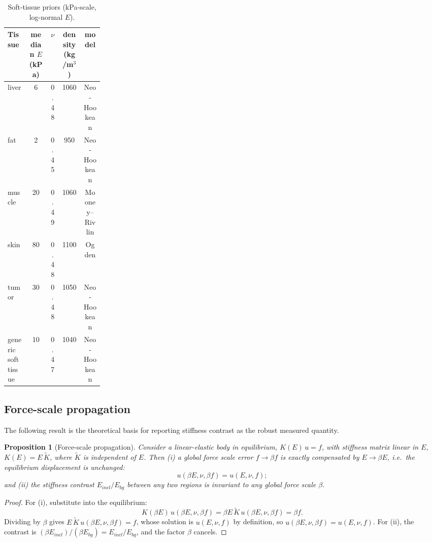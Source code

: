 \documentclass[review]{elsarticle}
\newtheorem{proposition}{Proposition}
\begin{document}
\begin{table}[htbp]
\centering
\caption{Soft-tissue priors (kPa-scale, log-normal $E$).}
\label{tab:tissue}
\footnotesize
\begin{tabular}{@{}p{0.22\linewidth}cccc@{}}
\toprule
Tissue & median $E$ (kPa) & $\nu$ & density (kg/m$^3$) & model \\
\midrule
liver & 6 & 0.48 & 1060 & Neo-Hookean \\
fat & 2 & 0.45 & 950 & Neo-Hookean \\
muscle & 20 & 0.49 & 1060 & Mooney--Rivlin \\
skin & 80 & 0.48 & 1100 & Ogden \\
tumor & 30 & 0.48 & 1050 & Neo-Hookean \\
generic soft tissue & 10 & 0.47 & 1040 & Neo-Hookean \\
\bottomrule
\end{tabular}
\end{table}

\subsection{Force-scale propagation}
\label{sec:forcescale}
The following result is the theoretical basis for reporting stiffness
contrast as the robust measured quantity.

\begin{proposition}[Force-scale propagation]
\label{prop:forcescale}
Consider a linear-elastic body in equilibrium, $K(E)\,u = f$, with
stiffness matrix linear in $E$, $K(E) = E\,\tilde{K}$, where $\tilde{K}$ is
independent of $E$. Then (i) a global force scale error $f \to \beta f$ is
exactly compensated by $E \to \beta E$, i.e.\ the equilibrium displacement
is unchanged:
\begin{equation}
u(\beta E, \nu, \beta f) = u(E, \nu, f);
\label{eq:scale}
\end{equation}
and (ii) the stiffness contrast $E_{incl}/E_{bg}$ between any two regions
is invariant to any global force scale $\beta$.
\end{proposition}

\begin{proof}
For (i), substitute into the equilibrium:
\begin{equation*}
K(\beta E)\,u(\beta E, \nu, \beta f) = \beta E\,\tilde{K}\,u(\beta E, \nu, \beta f) = \beta f.
\end{equation*}
Dividing by $\beta$ gives $E\,\tilde{K}\,u(\beta E, \nu, \beta f) = f$,
whose solution is $u(E,\nu,f)$ by definition, so
$u(\beta E, \nu, \beta f) = u(E, \nu, f)$. For (ii), the contrast is
$(\beta E_{incl})/(\beta E_{bg}) = E_{incl}/E_{bg}$, and the factor $\beta$
cancels.
\end{proof}
\end{document}
